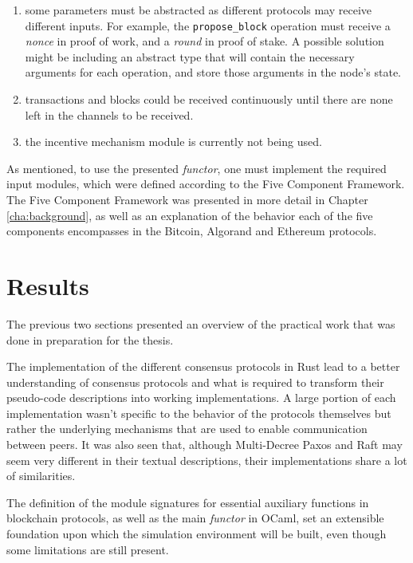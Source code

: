 \begin{enumerate}
    \item some parameters must be abstracted as different protocols may receive different inputs. For example, the \texttt{propose\_block} operation must receive a \textit{nonce} in proof of work, and a \textit{round} in proof of stake. A possible solution might be including an abstract type that will contain the necessary arguments for each operation, and store those arguments in the node's state.
    \item transactions and blocks could be received continuously until there are none left in the channels to be received.
    \item the incentive mechanism module is currently not being used.
\end{enumerate}



\vspace{0.2cm}

As mentioned, to use the presented \textit{functor}, one must implement the required input modules, which were defined according to the Five Component Framework. The Five Component Framework was presented in more detail in Chapter \ref{cha:background}, as well as an explanation of the behavior each of the five components encompasses in the Bitcoin, Algorand and Ethereum protocols.




\section{Results}

The previous two sections presented an overview of the practical work that was done in preparation for the thesis.

The implementation of the different consensus protocols in Rust lead to a better understanding of consensus protocols and what is required to transform their pseudo-code descriptions into working implementations. A large portion of each implementation wasn't specific to the behavior of the protocols themselves but rather the underlying mechanisms that are used to enable communication between peers. It was also seen that, although Multi-Decree Paxos and Raft may seem very different in their textual descriptions, their implementations share a lot of similarities.

The definition of the module signatures for essential auxiliary functions in blockchain protocols, as well as the main \textit{functor} in OCaml, set an extensible foundation upon which the simulation environment will be built, even though some limitations are still present.